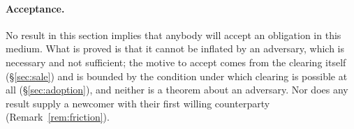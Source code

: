 \paragraph{Acceptance.} No result in this section implies that anybody will accept an
obligation in this medium. What is proved is that it cannot be inflated by an adversary,
which is necessary and not sufficient; the motive to accept comes from the clearing itself
(\S\ref{sec:sale}) and is bounded by the condition under which clearing is possible at all
(\S\ref{sec:adoption}), and neither is a theorem about an adversary. Nor does any result
supply a newcomer with their first willing counterparty (Remark~\ref{rem:friction}).
